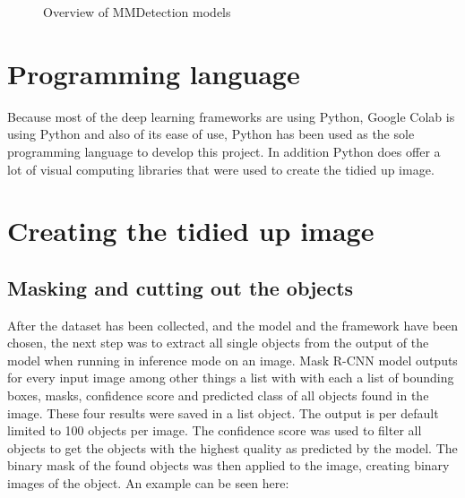 \begin{figure}[H]
	\caption{\label{fig:mmdetection-models} Overview of MMDetection models}
\end{figure}

\section{Programming language}

Because most of the deep learning frameworks are using Python, Google Colab is using Python and also of its ease of use, Python has been used as the sole programming language to develop this project. In addition Python does offer a lot of visual computing libraries that were used to create the tidied up image.

\section{Creating the tidied up image}

\subsection{Masking and cutting out the objects}

After the dataset has been collected, and the model and the framework have been chosen, the next step was to extract all single objects from the output of the model when running in inference mode on an image. Mask R-CNN model outputs for every input image among other things a list with with each a list of bounding boxes, masks, confidence score and predicted class of all objects found in the image. These four results were saved in a list object. The output is per default limited to 100 objects per image. The confidence score was used to filter all objects to get the objects with the highest quality as predicted by the model. The binary mask of the found objects was then applied to the image, creating binary images of the object. An example can be seen here:

